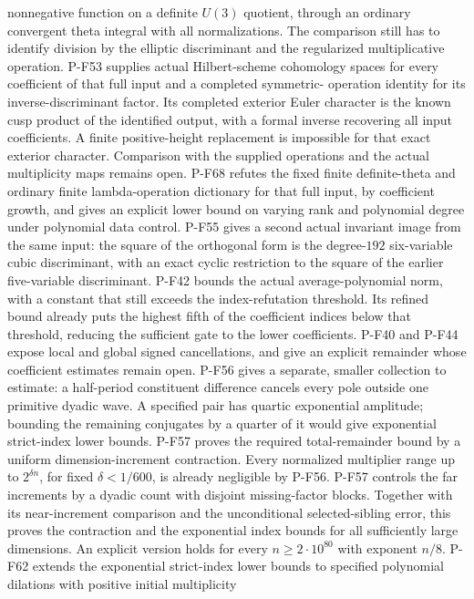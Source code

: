 nonnegative function on a definite $U(3)$ quotient, through
an ordinary convergent theta integral with all normalizations.
The comparison still has to identify division by the elliptic
discriminant and the regularized multiplicative operation.
P-F53 supplies actual Hilbert-scheme cohomology spaces for
every coefficient of that full input and a completed symmetric-
operation identity for its inverse-discriminant factor. Its
completed exterior Euler character is the known cusp product of
the identified output, with a formal inverse recovering all input
coefficients. A finite positive-height replacement is impossible
for that exact exterior character. Comparison with the supplied
operations and the actual multiplicity maps remains open.
P-F68 refutes the fixed finite definite-theta and ordinary finite
lambda-operation dictionary for that full input, by coefficient
growth, and gives an explicit lower bound on varying rank and
polynomial degree under polynomial data control.
P-F55 gives a second actual invariant image from the same input:
the square of the orthogonal form is the degree-$192$
six-variable cubic discriminant, with an exact cyclic restriction
to the square of the earlier five-variable discriminant.
P-F42 bounds the actual average-polynomial norm, with a constant
that still exceeds the index-refutation threshold. Its refined
bound already puts the highest fifth of the coefficient indices
below that threshold, reducing the sufficient gate to the lower
coefficients. P-F40 and
P-F44 expose local and global signed cancellations, and give
an explicit remainder whose coefficient estimates remain open.
P-F56 gives a separate, smaller collection to estimate: a half-period
constituent difference cancels every pole outside one primitive
dyadic wave. A specified pair has quartic exponential amplitude;
bounding the remaining conjugates by a quarter of it would give
exponential strict-index lower bounds. P-F57 proves the required
total-remainder bound by a uniform dimension-increment contraction.
Every normalized multiplier range up to $2^{\delta n}$, for
fixed $\delta<1/600$, is already negligible by P-F56.
P-F57 controls the far increments by a dyadic count with disjoint
missing-factor blocks. Together with its near-increment comparison
and the unconditional selected-sibling error, this proves the
contraction and the exponential index bounds for all sufficiently
large dimensions. An explicit version holds for every
$n\ge2\cdot10^{80}$ with exponent $n/8$.
P-F62 extends the exponential strict-index lower bounds to
specified polynomial dilations with positive initial multiplicity
